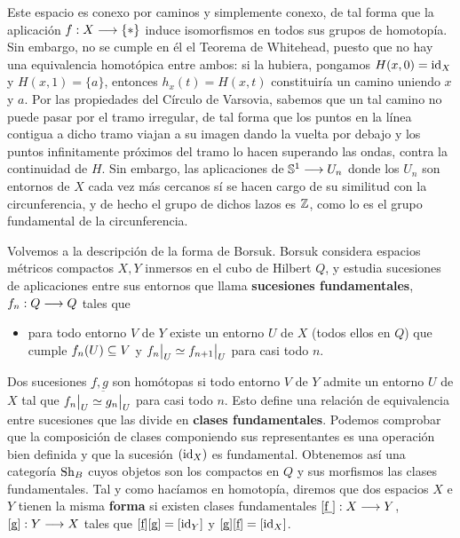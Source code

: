 Este espacio es conexo por caminos y simplemente conexo, de tal forma que la aplicación $ f:X\longrightarrow \{*\} $ induce isomorfismos en todos sus grupos de homotopía. Sin embargo, no se cumple en él el Teorema de Whitehead, puesto que no hay una equivalencia homotópica entre ambos: si la hubiera, pongamos $ H(x,0) = \operatorname{id}_{X} $ y $ H(x,1) = \{a\} $, entonces $ h_x(t) = H(x,t ) $ constituiría un camino uniendo $ x  $ y $ a  $. Por las propiedades del Círculo de Varsovia, sabemos que un tal camino no puede pasar por el tramo irregular, de tal forma que los puntos en la línea contigua a dicho tramo viajan a su imagen dando la vuelta por debajo y los puntos infinitamente próximos del tramo lo hacen superando las ondas, contra la continuidad de $ H  $. Sin embargo, las aplicaciones de $ \mathbb{S}^1 \longrightarrow U_n $ donde los $ U_n  $ son entornos de $ X  $ cada vez más cercanos sí se hacen cargo de su similitud con la circunferencia, y de hecho el grupo de dichos lazos es $ \mathbb{Z}  $, como lo es el grupo fundamental de la circunferencia.

Volvemos a la descripción de la forma de Borsuk. Borsuk considera espacios métricos compactos $ X, Y  $ inmersos en el cubo de Hilbert $ Q  $, y estudia sucesiones de aplicaciones entre sus entornos que llama \textbf{sucesiones fundamentales}, $ f_n:Q\longrightarrow Q  $ tales que
\begin{itemize}
  \item[] para todo entorno $ V$ de $Y  $ existe un entorno $ U  $ de $ X  $ (todos ellos en $ Q  $) que cumple $ f_n(U)\subseteq V  $ y $ \rest{f_n}{U} \simeq \rest{f_{n+1}  }{U }$ para casi todo $n$.
\end{itemize}
Dos sucesiones $ \underbar{f}, \underbar{g} $ son homótopas si todo entorno $ V  $ de $ Y  $ admite un entorno $ U  $ de $ X  $ tal que $ \rest{f_n}{U}\simeq \rest{g_n}{U} $ para casi todo $ n $. Esto define una relación de equivalencia entre sucesiones  que las divide en \textbf{clases fundamentales}. Podemos comprobar que la composición de clases componiendo sus representantes es una operación bien definida \cite[p. 232]{Borsuk_1968} y que la sucesión $ (\operatorname{id}_X ) $  es fundamental. Obtenemos así una categoría $ \operatorname{Sh}_B $ cuyos objetos son los compactos en $ Q $ y sus morfismos las clases fundamentales. Tal y como hacíamos en homotopía, diremos que dos espacios $ X$ e $Y $ tienen la misma \textbf{forma} si existen clases fundamentales $ [\underbar{f }]:X\longrightarrow Y  $, $ [\underbar{g}]:Y\longrightarrow X  $ tales que $ [\underbar{f}][\underbar{g}]  = [\operatorname{id}_{Y }] $ y $ [\underbar{g}][\underbar{f}]  = [\operatorname{id}_X ] $.     

